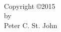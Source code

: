 \chapter*{}
\null
\vfill
\begin{center}
  \thetitle\\[2ex]
  Copyright \copyright 2015\\
  by\\
  Peter C. St. John
\end{center}

